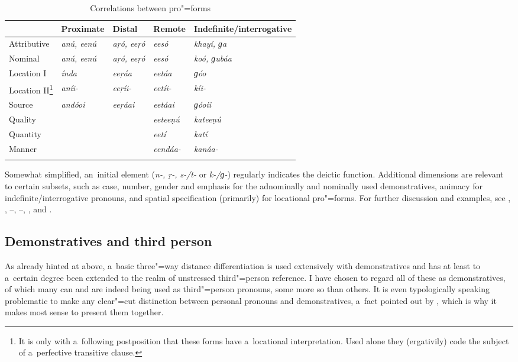 \begin{table}[ht]
\caption{Correlations between pro"=forms}
\begin{tabularx}{\textwidth}{ Q Q Q Q Q }
\lsptoprule
&
Proximate
&
Distal
&
Remote
&
Indefinite/{\allowbreak}interrogative\\\hline
Attributive &
\textit{anú, eenú} &
\textit{aṛó, eeṛó} &
\textit{eesó} &
\textit{khayí, ɡa} \\
Nominal &
\textit{anú, eenú} &
\textit{aṛó, eeṛó} &
\textit{eesó} &
\textit{koó, ɡubáa} \\
Location I &
\textit{índa} &
\textit{eeṛáa} &
\textit{eetáa} &
\textit{ɡóo} \\
Location II\footnote{It is only with a~following postposition that these forms have a~locational interpretation. Used alone they (ergativily) code the subject of a~perfective transitive clause.} &
\textit{aníi-} &
\textit{eeṛíi-} &
\textit{eetíi-} &
\textit{kíi-} \\
Source &
\textit{andóoi} &
\textit{eeṛáai} &
\textit{eetáai} &
\textit{ɡóoii} \\
Quality &
&
&
\textit{eeteeṇú} &
\textit{kateeṇú} \\
Quantity &
&
&
\textit{eetí} &
\textit{katí} \\
Manner &
&
&
\textit{eendáa-} &
\textit{kanáa-} \\\lspbottomrule
\end{tabularx}
\label{tab:5-2}
\end{table}

Somewhat simplified, an~initial element (\textit{n-, ṛ-, s-/t-} or \textit{k-/ɡ-}) regularly indicates the deictic function. Additional dimensions are relevant to certain subsets, such as case, number, gender and emphasis for the adnominally and nominally used demonstratives, animacy for indefinite/interrogative pronouns, and spatial specification (primarily) for locational pro"=forms. For further discussion and examples, see , , --, --, ,  and .

\subsection{Demonstratives and third person}
\label{subsec:5-2-2}


As already hinted at above, a~basic three"=way distance differentiation is used extensively with demonstratives and has at least to a~certain degree been extended to the realm of unstressed third"=person reference. I have chosen to regard all of these as demonstratives, of which many can and are indeed being used as third"=person pronouns, some more so than others. It is even typologically speaking problematic to make any clear"=cut distinction between personal pronouns and demonstratives, a~fact pointed out by \citet[206]{himmelmann1996}, which is why it makes most sense to present them together.



